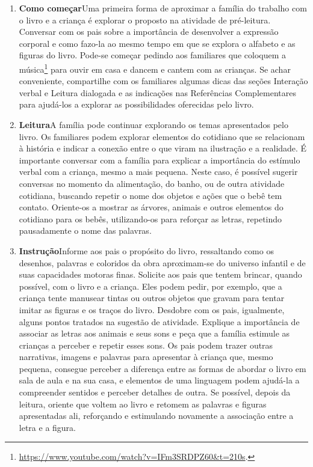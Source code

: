 \documentclass[11pt]{extarticle}
\begin{document}
\begin{enumerate}
\item \textbf{Como começar}\quad Uma primeira forma de aproximar a família do trabalho com o livro e a criança é explorar o proposto na atividade de pré-leitura. Conversar com os pais sobre a importância de desenvolver a expressão corporal e como fazo-la ao mesmo tempo em que se explora o alfabeto e as figuras do livro. Pode-se começar pedindo aos familiares que coloquem a música\footnote{\url{https://www.youtube.com/watch?v=IFm3SRDPZ60&t=210s}.} para ouvir em casa e dancem e cantem com as crianças.
Se achar conveniente, compartilhe com 
os familiares algumas dicas das seções Interação verbal 
e Leitura dialogada e as indicações nas Referências Complementares 
para ajudá-los a explorar as possibilidades oferecidas pelo livro. 

\item \textbf{Leitura}\quad A família pode continuar 
explorando os temas apresentados pelo livro. Os familiares podem explorar 
elementos do cotidiano que se relacionam à história e indicar a conexão 
entre o que viram na ilustração e a realidade.
É importante conversar com a família para explicar a importância do estímulo verbal com a criança, mesmo a mais pequena. Neste caso, é possível sugerir conversas no momento da alimentação, do banho, ou de outra atividade cotidiana, buscando repetir o nome dos objetos e ações que o bebê tem contato. 
Oriente-os a mostrar as 
árvores, animais e outros elementos do cotidiano para os bebês, utilizando-os para reforçar as letras, repetindo pausadamente o nome das palavras.

\item \textbf{Instrução}\quad Informe aos pais o propósito do livro, ressaltando como os desenhos, palavras e coloridos da obra aproximam-se do universo infantil e de suas capacidades motoras finas. Solicite aos pais que tentem brincar, quando possível, com o livro e a criança. Eles podem pedir, por exemplo, que a criança tente manusear tintas ou outros objetos que gravam para tentar imitar as figuras e os traços do livro.
Desdobre com os pais, igualmente, alguns pontos tratados na sugestão de atividade.
Explique a importância de associar as letras aos animais e seus sons e peça que a família estimule as crianças a perceber e repetir esses sons.
Os pais podem trazer outras narrativas, imagens e palavras para apresentar à criança que, mesmo pequena, consegue perceber a diferença entre 
as formas de abordar o livro em sala de aula e na sua casa, e elementos de uma linguagem podem ajudá-la a compreender sentidos e perceber detalhes de outra. Se possível, depois da leitura, oriente que voltem ao livro e retomem as palavras e figuras apresentadas ali, reforçando e estimulando novamente a associação entre a letra e a figura.


\end{enumerate}
\end{document}
